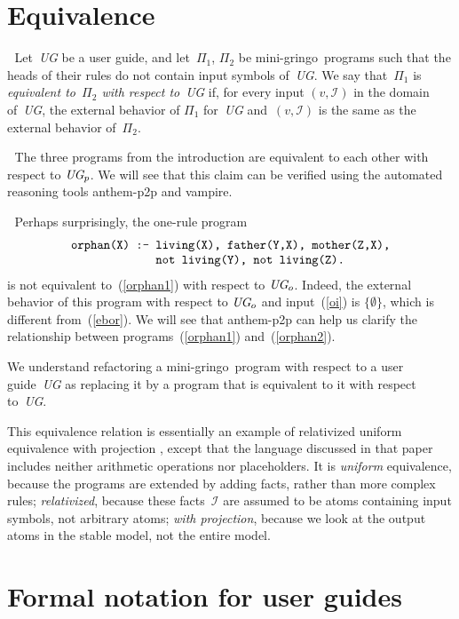 \documentclass{new_tlp}
\def\beq{\begin{equation}}
\def\eeq#1{\label{#1}\end{equation}}
\def\ba{\begin{array}}
\def\ea{\end{array}}
\def\gringo{{\sc gringo}}
\def\vampire{{\sc vampire}}
\newcommand{\I}{\mathcal{I}}
\begin{document}
\section{Equivalence}

$\;$
Let~\emph{UG} be a user guide, and let~$\Pi_1$, $\Pi_2$ be mini-\gringo\
programs such that the heads of their rules do not contain input symbols
of~\emph{UG}.  We say that~$\Pi_1$ is \emph{equivalent to~$\Pi_2$ with
respect to}~\emph{UG} if, for every input $(v,\I)$ in the domain of~\emph{UG},
the external behavior of $\Pi_1$ for~\emph{UG} and~$(v,\I)$ is the
same as the external behavior of~$\Pi_2$.

\medskip{}$\;$ The three programs from the
introduction are equivalent to each other with respect to $\emph{UG}_p$.
We will see that this claim can be verified using the automated reasoning
tools {\sc anthem-p2p} and \vampire.

\medskip{}$\;$ Perhaps surprisingly,
the one-rule program
\beq\ba l
\verb|orphan(X) :- living(X), father(Y,X), mother(Z,X),|\\
\verb|             not living(Y), not living(Z).|
\ea\eeq{orphan2}
is not equivalent to~(\ref{orphan1}) with respect to $\emph{UG}_o$.
Indeed, the external behavior of this program with respect
to $\emph{UG}_o$ and input~(\ref{oi}) is $\{\emptyset\}$, which
is different from~(\ref{ebor}).  We will see
that {\sc anthem-p2p} can help us clarify the relationship between
programs~(\ref{orphan1}) and~(\ref{orphan2}).

\medskip
We understand refactoring a mini-\gringo\ program with respect to a
  user guide~\emph{UG} as replacing it by a program that is equivalent
  to it with respect to~\emph{UG}.

This equivalence relation is essentially an
example of relativized uniform equivalence with projection
\cite{oet08}, except that the language discussed in that paper includes
neither arithmetic operations nor placeholders.
It is \emph{uniform} equivalence, because the programs are extended by
adding facts, rather than more complex rules; \emph{relativized},
because these
  facts~$\I$ are assumed to be atoms containing input symbols,
  not arbitrary atoms; \emph{with projection}, because
  we look at the output atoms in the stable model, not the entire model.

\section{Formal notation for user guides} \label{sec:fn}
\end{document}
